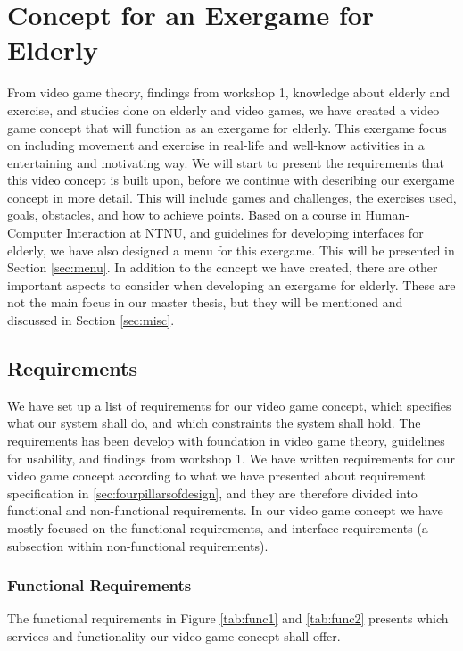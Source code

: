 \chapter{Concept for an Exergame for Elderly}
From video game theory, findings from workshop 1, knowledge about elderly and exercise, and studies done on elderly and video games, we have created a video game concept that will function as an exergame for elderly. This exergame focus on including movement and exercise in real-life and well-know activities in a entertaining and motivating way. We will start to present the requirements that this video concept is built upon, before we continue with describing our exergame concept in more detail. This will include games and challenges, the exercises used, goals, obstacles, and how to achieve points. Based on a course in Human-Computer Interaction at NTNU, and guidelines for developing interfaces for elderly, we have also designed a menu for this exergame. This will be presented in Section \ref{sec:menu}. In addition to the concept we have created, there are other important aspects to consider when developing an exergame for elderly. These are not the main focus in our master thesis, but they will be mentioned and discussed in Section \ref{sec:misc}.

\section{Requirements}
\label{sec:req}
We have set up a list of requirements for our video game concept, which specifies what our system shall do, and which constraints the system shall hold. The requirements has been develop with foundation in video game theory, guidelines for usability, and findings from workshop 1. We have written requirements for our video game concept according to what we have presented about requirement specification in \ref{sec:fourpillarsofdesign}, and they are therefore divided into functional and non-functional requirements. In our video game concept we have mostly focused on the functional requirements, and interface requirements (a subsection within non-functional requirements).

\subsection{Functional Requirements}
The functional requirements in Figure \ref{tab:func1} and \ref{tab:func2} presents which services and functionality our video game concept shall offer.

